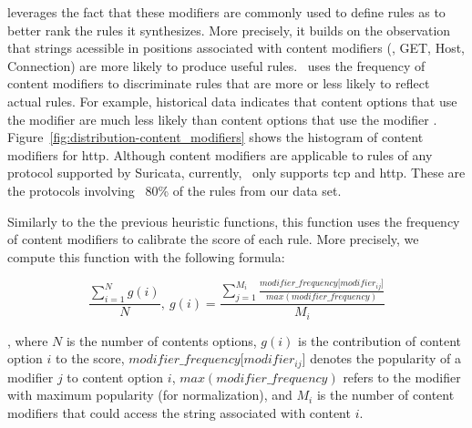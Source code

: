 \documentclass[sigconf,review, anonymous]{acmart}
\begin{document}
\tname{} leverages the fact that these modifiers are commonly used to
define rules as to better rank the rules it synthesizes. More
precisely, it builds on the observation that strings acessible in
positions associated with content modifiers (\eg{}, GET, Host,
Connection) are more likely to produce useful rules. \tname\ uses the
frequency of content modifiers to discriminate rules that are more or
less likely to reflect actual rules. For example, historical data
indicates that content options that use the 
modifier are much less likely than content options that use the
modifier
. Figure~\ref{fig:distribution-content_modifiers}
shows the histogram of content modifiers for http. Although content
modifiers are applicable to rules of any protocol supported by
Suricata, currently, \tname\ only supports tcp and http. These are the
protocols involving ~80\% of the rules from our data set.


Similarly to the the previous heuristic functions, this function uses
the frequency of content modifiers to calibrate the score of each
rule. More precisely, we compute this function with the following
formula:

\[\frac{\sum_{i=1}^{N}g(i)}{N},~g(i)=\frac{\sum_{j=1}^{M_i}\frac{\mathit{modifier\_frequency[modifier_{ij}}]}{\mathit{max(modifier\_frequency)}}}{M_i}\]

\noindent
, where $N$ is the number of contents options, $g(i)$ is the
contribution of content option $i$ to the score,
$\mathit{modifier\_frequency[modifier_{ij}}]$ denotes the popularity
of a modifier $j$ to content option $i$,
$\mathit{max(modifier\_frequency)}$ refers to the modifier with
maximum popularity (for normalization), and $M_i$ is the number of
content modifiers that could access the string associated with content
$i$.


                                                                             
\end{document}
